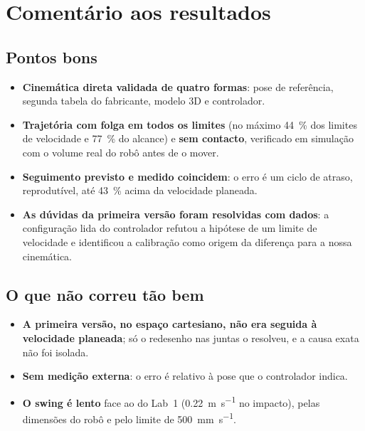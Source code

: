 \section{Comentário aos resultados}
\label{sec:comentario}

\subsection*{\textcolor{bom}{Pontos bons}}

\begin{itemize}[itemsep=2pt]
  \item \textbf{Cinemática direta validada de quatro formas}: pose de
        referência, segunda tabela do fabricante, modelo 3D e controlador.
  \item \textbf{Trajetória com folga em todos os limites} (no máximo
        \SI{44}{\percent} dos limites de velocidade e \SI{77}{\percent} do
        alcance) e \textbf{sem contacto}, verificado
        em simulação com o volume real do robô antes de o mover.
  \item \textbf{Seguimento previsto e medido coincidem}: o erro é um ciclo de
        atraso, reprodutível, até \SI{43}{\percent} acima da velocidade
        planeada.
  \item \textbf{As dúvidas da primeira versão foram resolvidas com dados}: a
        configuração lida do controlador refutou a hipótese de um limite de
        velocidade e identificou a calibração como origem da diferença para a
        nossa cinemática.
\end{itemize}

\subsection*{\textcolor{mau}{O que não correu tão bem}}

\begin{itemize}[itemsep=2pt]
  \item \textbf{A primeira versão, no espaço cartesiano, não era seguida à
        velocidade planeada}; só o redesenho nas juntas o resolveu, e a causa
        exata não foi isolada.
  \item \textbf{Sem medição externa}: o erro é relativo à pose que o
        controlador indica.
  \item \textbf{O swing é lento} face ao do Lab~1
        (\SI{0.22}{\meter\per\second} no impacto), pelas dimensões do robô e
        pelo limite de \SI{500}{\milli\meter\per\second}.
\end{itemize}

